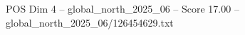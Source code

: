 \begin{textsample}{POS Dim 4 – global\_north\_2025\_06 – Score 17.00 – global\_north\_2025\_06/126454629.txt}
\end{textsample}

